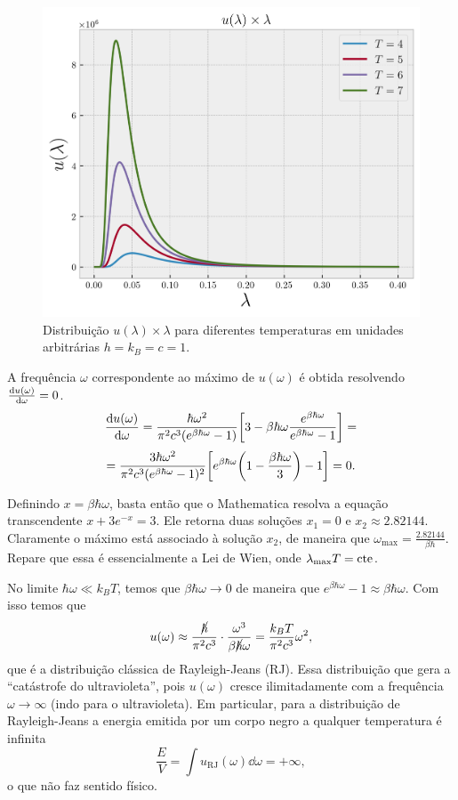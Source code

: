 \documentclass[a4paper,10pt]{article}
\begin{document}
\begin{figure}[H]
\centering
\includegraphics[width=0.6\linewidth]{fig/planck-lambda.png}
\caption{Distribuição $u(\lambda) \times \lambda$ para diferentes temperaturas em unidades arbitrárias $h = k_B = c = 1$.}
\label{fig:planck}
\end{figure}

A frequência $\omega$ correspondente ao máximo de $u(\omega)$ é obtida resolvendo $\dv{u(\omega)}{\omega} = 0$.
$$
\dv{u(\omega)}{\omega} =
\frac{\hbar \omega^2}{\pi^2 c^3 (e^{\beta\hbar\omega} - 1)}
\qty[3 - \beta\hbar\omega \frac{e^{\beta\hbar\omega}}{e^{\beta\hbar\omega} - 1}] =
$$
$$
=
\frac{3 \hbar \omega^2}{\pi^2 c^3 (e^{\beta\hbar\omega} - 1)^2}
\qty[e^{\beta\hbar\omega} \qty(1 - \frac{\beta\hbar\omega}{3}) - 1] = 0.
$$

Definindo $x = \beta\hbar\omega$, basta então que o Mathematica resolva a equação transcendente $x + 3e^{-x} = 3$. Ele retorna duas soluções $x_1 = 0$ e $x_2 \approx 2.82144$. Claramente o máximo está associado à solução $x_2$, de maneira que $\boxed{\omega_{\text{max}} = \frac{2.82144}{\beta\hbar}}$. Repare que essa é essencialmente a Lei de Wien, onde $\lambda_{\text{max}} T = \text{cte}$.

\n

No limite $\hbar\omega \ll k_B T$, temos que $\beta \hbar \omega \to 0$ de maneira que $e^{\beta\hbar\omega} - 1 \approx \beta\hbar\omega$. Com isso temos que
$$
u(\omega) \approx \frac{\cancel{\hbar}}{\pi^2 c^3} \cdot \frac{\omega^3}{\beta\cancel{\hbar}\omega} = \frac{k_B T}{\pi^2 c^3} \omega^2,
$$
que é a distribuição clássica de Rayleigh-Jeans (RJ). Essa distribuição que gera a ``catástrofe do ultravioleta'', pois $u(\omega)$ cresce ilimitadamente com a frequência $\omega \to \infty$ (indo para o ultravioleta). Em particular, para a distribuição de Rayleigh-Jeans a energia emitida por um corpo negro a qualquer temperatura é infinita
$$
\frac{E}{V} = \int u_{\text{RJ}}(\omega) \dd{\omega} = +\infty,
$$
o que não faz sentido físico.
\end{document}
